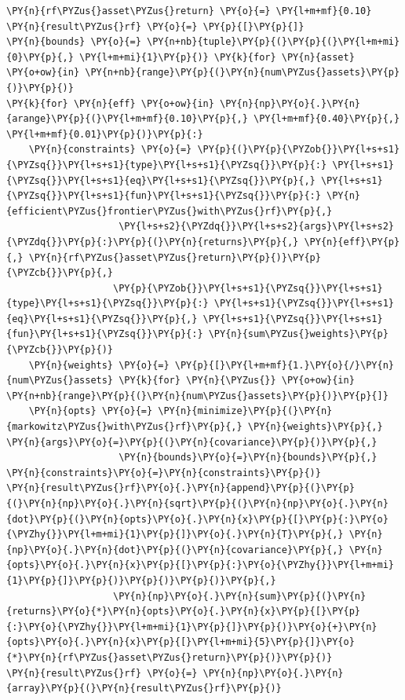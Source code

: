 \begin{tcolorbox}[breakable, size=fbox, boxrule=1pt, pad at break*=1mm,colback=cellbackground, colframe=cellborder]
\begin{Verbatim}[commandchars=\\\{\}]
\PY{n}{rf\PYZus{}asset\PYZus{}return} \PY{o}{=} \PY{l+m+mf}{0.10}
\PY{n}{result\PYZus{}rf} \PY{o}{=} \PY{p}{[}\PY{p}{]}
\PY{n}{bounds} \PY{o}{=} \PY{n+nb}{tuple}\PY{p}{(}\PY{p}{(}\PY{l+m+mi}{0}\PY{p}{,} \PY{l+m+mi}{1}\PY{p}{)} \PY{k}{for} \PY{n}{asset} \PY{o+ow}{in} \PY{n+nb}{range}\PY{p}{(}\PY{n}{num\PYZus{}assets}\PY{p}{)}\PY{p}{)}
\PY{k}{for} \PY{n}{eff} \PY{o+ow}{in} \PY{n}{np}\PY{o}{.}\PY{n}{arange}\PY{p}{(}\PY{l+m+mf}{0.10}\PY{p}{,} \PY{l+m+mf}{0.40}\PY{p}{,} \PY{l+m+mf}{0.01}\PY{p}{)}\PY{p}{:}
    \PY{n}{constraints} \PY{o}{=} \PY{p}{(}\PY{p}{\PYZob{}}\PY{l+s+s1}{\PYZsq{}}\PY{l+s+s1}{type}\PY{l+s+s1}{\PYZsq{}}\PY{p}{:} \PY{l+s+s1}{\PYZsq{}}\PY{l+s+s1}{eq}\PY{l+s+s1}{\PYZsq{}}\PY{p}{,} \PY{l+s+s1}{\PYZsq{}}\PY{l+s+s1}{fun}\PY{l+s+s1}{\PYZsq{}}\PY{p}{:} \PY{n}{efficient\PYZus{}frontier\PYZus{}with\PYZus{}rf}\PY{p}{,} 
                    \PY{l+s+s2}{\PYZdq{}}\PY{l+s+s2}{args}\PY{l+s+s2}{\PYZdq{}}\PY{p}{:}\PY{p}{(}\PY{n}{returns}\PY{p}{,} \PY{n}{eff}\PY{p}{,} \PY{n}{rf\PYZus{}asset\PYZus{}return}\PY{p}{)}\PY{p}{\PYZcb{}}\PY{p}{,}
                   \PY{p}{\PYZob{}}\PY{l+s+s1}{\PYZsq{}}\PY{l+s+s1}{type}\PY{l+s+s1}{\PYZsq{}}\PY{p}{:} \PY{l+s+s1}{\PYZsq{}}\PY{l+s+s1}{eq}\PY{l+s+s1}{\PYZsq{}}\PY{p}{,} \PY{l+s+s1}{\PYZsq{}}\PY{l+s+s1}{fun}\PY{l+s+s1}{\PYZsq{}}\PY{p}{:} \PY{n}{sum\PYZus{}weights}\PY{p}{\PYZcb{}}\PY{p}{)}
    \PY{n}{weights} \PY{o}{=} \PY{p}{[}\PY{l+m+mf}{1.}\PY{o}{/}\PY{n}{num\PYZus{}assets} \PY{k}{for} \PY{n}{\PYZus{}} \PY{o+ow}{in} \PY{n+nb}{range}\PY{p}{(}\PY{n}{num\PYZus{}assets}\PY{p}{)}\PY{p}{]}
    \PY{n}{opts} \PY{o}{=} \PY{n}{minimize}\PY{p}{(}\PY{n}{markowitz\PYZus{}with\PYZus{}rf}\PY{p}{,} \PY{n}{weights}\PY{p}{,} \PY{n}{args}\PY{o}{=}\PY{p}{(}\PY{n}{covariance}\PY{p}{)}\PY{p}{,}
                    \PY{n}{bounds}\PY{o}{=}\PY{n}{bounds}\PY{p}{,} \PY{n}{constraints}\PY{o}{=}\PY{n}{constraints}\PY{p}{)}
\PY{n}{result\PYZus{}rf}\PY{o}{.}\PY{n}{append}\PY{p}{(}\PY{p}{(}\PY{n}{np}\PY{o}{.}\PY{n}{sqrt}\PY{p}{(}\PY{n}{np}\PY{o}{.}\PY{n}{dot}\PY{p}{(}\PY{n}{opts}\PY{o}{.}\PY{n}{x}\PY{p}{[}\PY{p}{:}\PY{o}{\PYZhy{}}\PY{l+m+mi}{1}\PY{p}{]}\PY{o}{.}\PY{n}{T}\PY{p}{,} \PY{n}{np}\PY{o}{.}\PY{n}{dot}\PY{p}{(}\PY{n}{covariance}\PY{p}{,} \PY{n}{opts}\PY{o}{.}\PY{n}{x}\PY{p}{[}\PY{p}{:}\PY{o}{\PYZhy{}}\PY{l+m+mi}{1}\PY{p}{]}\PY{p}{)}\PY{p}{)}\PY{p}{)}\PY{p}{,} 
                   \PY{n}{np}\PY{o}{.}\PY{n}{sum}\PY{p}{(}\PY{n}{returns}\PY{o}{*}\PY{n}{opts}\PY{o}{.}\PY{n}{x}\PY{p}{[}\PY{p}{:}\PY{o}{\PYZhy{}}\PY{l+m+mi}{1}\PY{p}{]}\PY{p}{)}\PY{o}{+}\PY{n}{opts}\PY{o}{.}\PY{n}{x}\PY{p}{[}\PY{l+m+mi}{5}\PY{p}{]}\PY{o}{*}\PY{n}{rf\PYZus{}asset\PYZus{}return}\PY{p}{)}\PY{p}{)}
\PY{n}{result\PYZus{}rf} \PY{o}{=} \PY{n}{np}\PY{o}{.}\PY{n}{array}\PY{p}{(}\PY{n}{result\PYZus{}rf}\PY{p}{)}
\end{Verbatim}
\end{tcolorbox}


